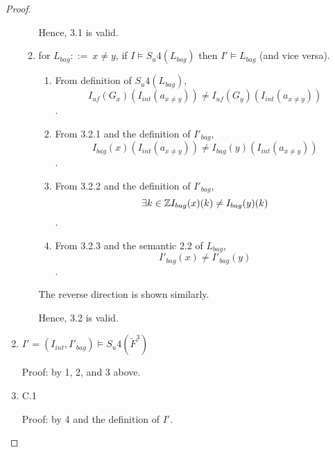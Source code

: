 \begin{proof}
\begin{enumerate}[1.]
\begin{enumerate}[3.1]
Hence, 3.1 is valid.


\item %
for $L_{bag}::=\ x \neq y$, if $I \models S_{u}4(L_{bag})$ then $I'\models L_{bag}$ (and vice versa). \\

\begin{enumerate}[3.2.1]
\item %
From definition of $S_{u}4(L_{bag})$,
$$I_{\textit{uf}}(G_{x})(I_{int}(a_{x\neq y})) \neq I_{\textit{uf}}(G_{y})(I_{int}(a_{x\neq y}))$$.

\item %
From 3.2.1 and the definition of $I'_{bag}$,
$$I_{bag}(x)(I_{int}(a_{x\neq y})) \neq I_{bag}(y)(I_{int}(a_{x\neq y}))$$.

\item %
From 3.2.2 and the definition of $I'_{bag}$,
$$\exists k \in \mathbb{Z} I_{bag}(x)(k) \neq I_{bag}(y)(k)$$.

\item %
From 3.2.3 and the semantic 2.2 of $L_{bag}$,
$$I'_{bag}(x) \neq I'_{bag}(y)$$.

\end{enumerate}
The reverse direction is shown similarly.

Hence, 3.2 is valid.

\end{enumerate} %

\item %
$I'=(I_{int},I'_{bag})\models S_{u}4(\tilde{F}^3)$

Proof: by 1, 2, and 3 above.


\item %
C.1

Proof: by 4 and the definition of $I'$.

\end{enumerate}
\end{proof}
